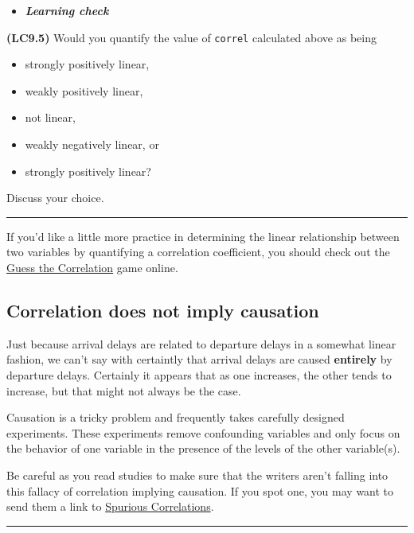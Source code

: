 \documentclass[]{tufte-book}
\let\oldrule=\rule
\renewcommand{\rule}[1]{\oldrule{\linewidth}}
\providecommand{\tightlist}{%
  \setlength{\itemsep}{0pt}\setlength{\parskip}{0pt}}
\newenvironment{rmdblock}[1]
  {\begin{shaded*}
  \begin{itemize}
  \renewcommand{\labelitemi}{
    \raisebox{-.7\height}[0pt][0pt]{
    }
  }
  \item
  }
  {
  \end{itemize}
  \end{shaded*}
  }
\newenvironment{learncheck}
  {\begin{rmdblock}{warning}}
  {\end{rmdblock}}
\theoremstyle{definition}
\theoremstyle{definition}
\theoremstyle{remark}
\begin{document}
\begin{learncheck}
\textbf{\emph{Learning check}}
\end{learncheck}

\textbf{(LC9.5)} Would you quantify the value of \texttt{correl}
calculated above as being

\begin{itemize}
\tightlist
\item
  strongly positively linear,
\item
  weakly positively linear,
\item
  not linear,
\item
  weakly negatively linear, or
\item
  strongly positively linear?
\end{itemize}

Discuss your choice.

\begin{center}\rule{0.5\linewidth}{\linethickness}\end{center}

If you'd like a little more practice in determining the linear
relationship between two variables by quantifying a correlation
coefficient, you should check out the
\href{http://guessthecorrelation.com/}{Guess the Correlation} game
online.

\subsection{Correlation does not imply
causation}\label{correlation-does-not-imply-causation}

Just because arrival delays are related to departure delays in a
somewhat linear fashion, we can't say with certaintly that arrival
delays are caused \textbf{entirely} by departure delays. Certainly it
appears that as one increases, the other tends to increase, but that
might not always be the case.

Causation is a tricky problem and frequently takes carefully designed
experiments. These experiments remove confounding variables and only
focus on the behavior of one variable in the presence of the levels of
the other variable(s).

Be careful as you read studies to make sure that the writers aren't
falling into this fallacy of correlation implying causation. If you spot
one, you may want to send them a link to
\href{http://www.tylervigen.com/spurious-correlations}{Spurious
Correlations}.

\begin{center}\rule{0.5\linewidth}{\linethickness}\end{center}
\end{document}
